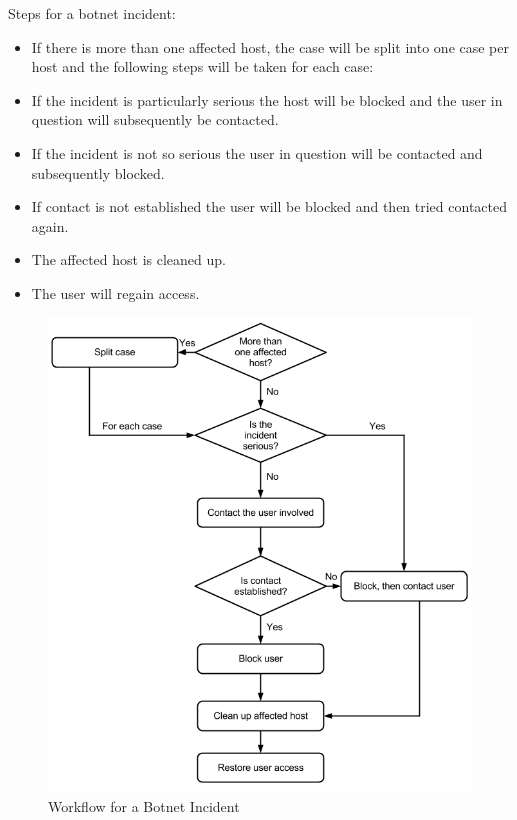 Steps for a botnet incident:
\begin{itemize}\itemsep-0.2cm
\item If there is more than one affected host, the case will be split into one case per host and the following steps will be taken for each case:
\item If the incident is particularly serious the host will be blocked and the user in question will subsequently be contacted.
\item If the incident is not so serious the user in question will be contacted and subsequently blocked.
\item If contact is not established the user will be blocked and then tried contacted again.
\item The affected host is cleaned up.
\item The user will regain access.
\end{itemize}

\begin{figure}[H]
\begin{center}
\includegraphics[scale=0.53]{WorkflowCaseABotnet.png}
\caption[Workflow for a Botnet Incident, Case A]{Workflow for a Botnet Incident}
\label{fig:WorkflowCaseABotnet}
\end{center}
\end{figure}

